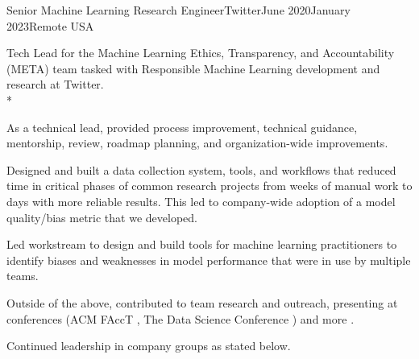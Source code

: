 \documentclass[print]{friggeri-cv} %
\begin{document}
\begin{job}
  {\twittericon}{Senior Machine Learning Research Engineer}{Twitter}{June 2020}{January 2023}{Remote \textemdash USA}{
    Tech Lead for the Machine Learning Ethics, Transparency, and Accountability
    (META) team tasked with Responsible Machine Learning development and
    research at Twitter.\\*
    \begin{myitemize}
      \item As a technical lead, provided process improvement, technical guidance, mentorship, review, roadmap
      planning, and organization-wide improvements.

      \item Designed and built a data collection system, tools, and workflows that reduced time in critical
      phases of common research projects from weeks of manual work to days with more reliable results.
      This led to company-wide adoption of a model quality/bias metric that we developed.

      \item Led workstream to design and build tools for machine learning practitioners to identify biases and
      weaknesses in model performance that were in use by multiple teams.

      \item Outside of the above, contributed to team
      research\autocite{twitter_htl_racial_bias,twitter_recsys_distributional_inequality} and outreach,
      presenting at conferences (ACM FAccT \autocite{facct_2022_talk}, The Data Science Conference
      \autocite{datascience_2022_talk}) and more \autocite{privacy_enchancing_tech_post}.

      \item Continued leadership in company groups as stated below.

    \end{myitemize}
  }
\end{job}
\end{document}
